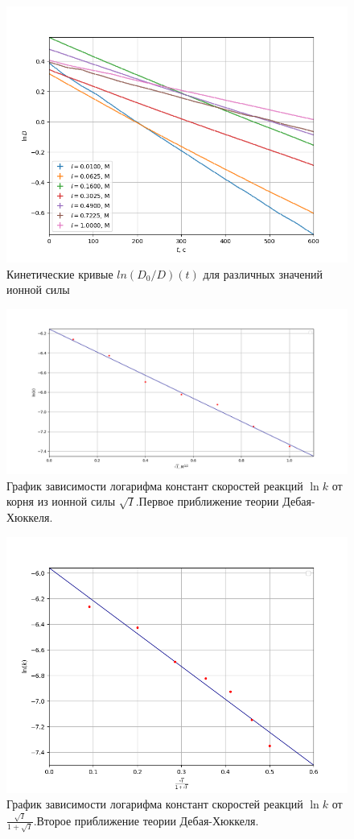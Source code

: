 \documentclass[a4paper,12pt]{article}
\begin{document}
\begin{figure}[H!]
\begin{center}
\includegraphics[width = 0.75\linewidth]{ion_1.png}
\end{center}
\caption{Кинетические кривые $ln(D_0/D)(t)$ для различных значений ионной силы}
\end{figure}

\begin{figure}[H!]
\begin{center}
\includegraphics[width = 0.9\linewidth]{ion_2.png}
\end{center}
\caption{График зависимости логарифма констант скоростей реакций $\ln k$ от корня из ионной силы $\sqrt {I}$.Первое приближение теории Дебая-Хюккеля. }
\end{figure}

\begin{figure}[h!]
\begin{center}
\includegraphics[width = 0.75\linewidth]{ion_3.png}
\end{center}
\caption{График зависимости логарифма констант скоростей реакций $\ln k$ от $ \frac{\sqrt{I}}{1+\sqrt{I}}$.Второе приближение теории Дебая-Хюккеля.}
\end{figure}
\end{document}

